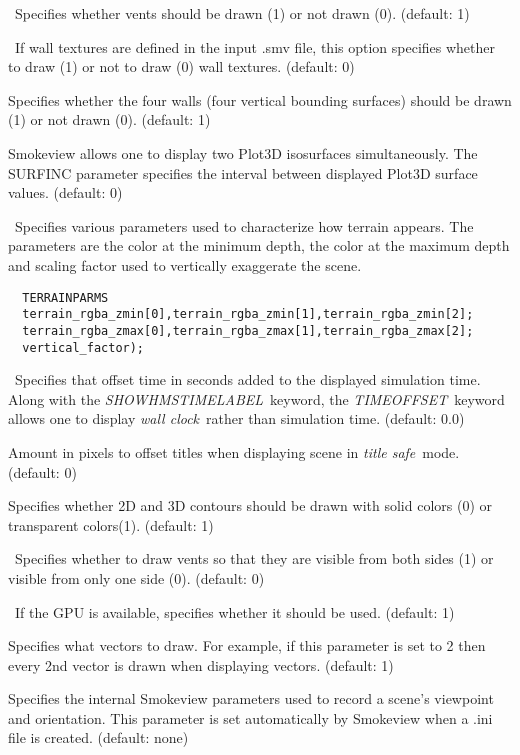 \documentclass[11pt,twoside]{book}
\begin{document}
{\ Specifies whether vents should be drawn
(1) or not drawn (0).  (default: 1)

\ If wall textures are defined in the input .smv file, this
option specifies whether to draw (1) or not to draw (0) wall textures.
(default: 0)


Specifies whether
the four walls (four vertical bounding surfaces) should be drawn (1) or not drawn (0).
(default: 1)

Smokeview allows one to display two Plot3D
isosurfaces simultaneously.  The SURFINC parameter specifies the
interval between displayed Plot3D surface values. (default: 0)

\ Specifies various parameters used to characterize
how terrain appears.  The parameters are the color at the minimum depth,
the color at the maximum depth and scaling factor used to vertically exaggerate
the scene.
\begin{lstlisting}
  TERRAINPARMS
  terrain_rgba_zmin[0],terrain_rgba_zmin[1],terrain_rgba_zmin[2];
  terrain_rgba_zmax[0],terrain_rgba_zmax[1],terrain_rgba_zmax[2];
  vertical_factor);
\end{lstlisting}

\ Specifies that offset time in seconds added to
the displayed simulation time.  Along with the {\em
SHOWHMSTIMELABEL}\ keyword, the {\em TIMEOFFSET}\ keyword allows
one to display {\em wall clock}\ rather than simulation time.
(default: 0.0)

Amount in pixels to offset titles when displaying
scene in {\em title safe}\ mode.   (default: 0)

Specifies whether 2D and 3D contours should be
drawn with solid colors (0) or transparent colors(1). (default: 1)

\  Specifies whether to draw vents so that they are visible from
both sides (1) or visible from only one side (0).  (default: 0)

\ If the GPU is available, specifies whether it should be used. (default: 1)

Specifies
what vectors to draw.  For example, if this parameter is set to 2 then
every 2nd vector is drawn when displaying vectors.
(default: 1)

Specifies the internal Smokeview parameters used
to record a scene's viewpoint and orientation.  This parameter is
set automatically by Smokeview when a .ini file is created.
(default: none)

}
\end{document}
